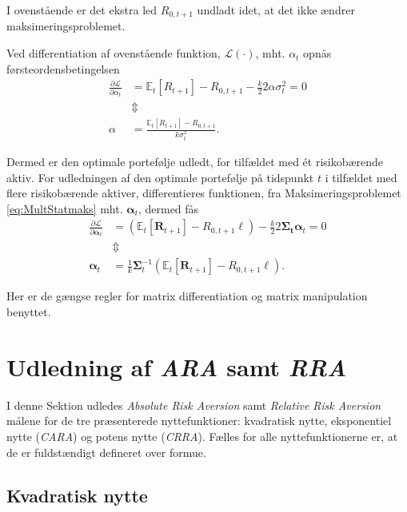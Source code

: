 \documentclass[
  a4paper,
  oneside]{memoir}
\begin{document}
I ovenstående er det ekstra led \(R_{0,t+1}\) undladt idet, at det ikke ændrer maksimeringsproblemet.

Ved differentiation af ovenstående funktion, \(\mathcal{L}(\cdot)\), mht. \(\alpha_t\) opnås førsteordensbetingelsen
\begin{align*}
\frac{\partial \mathcal{L}}{\partial \alpha_t} &= \mathbb{E}_t\left[R_{t+1}\right] - R_{0,t+1} - \frac{k}{2}2\alpha\sigma_t^2=0\\
&\Updownarrow\\
\alpha&=\frac{\mathbb{E}_t\left[R_{t+1}\right]-R_{0,t+1}}{k\sigma_t^2}.
\end{align*}

Dermed er den optimale portefølje udledt, for tilfældet med ét risikobærende aktiv. For udledningen af den optimale portefølje på tidspunkt \(t\) i tilfældet med flere risikobærende aktiver, differentieres funktionen, fra Maksimeringsproblemet \eqref{eq:MultStatmaks} mht. \(\bm{\alpha}_t\), dermed fås
\begin{align*}
\frac{\partial \mathcal{L}}{\partial \bm{\alpha}_t} &= \left(\mathbb{E}_t\left[\bm{R}_{t+1}\right]- R_{0,t+1}\bm{\ell}\right) - \frac{k}{2}2\bm{\Sigma_t}\bm{\alpha}_t = 0\\
&\Updownarrow\\
\bm{\alpha}_t&=\frac{1}{k}\bm{\Sigma}_t^{-1}\left(\mathbb{E}_t\left[\bm{R}_{t+1}\right]-R_{0,t+1}\bm{\ell}\right).
\end{align*}

Her er de gængse regler for matrix differentiation og matrix manipulation benyttet.

\hypertarget{udledning-af-ara-samt-rra}{%
\section{\texorpdfstring{Udledning af \emph{ARA} samt \emph{RRA}}{Udledning af ARA samt RRA}}\label{udledning-af-ara-samt-rra}}

I denne Sektion udledes \emph{Absolute Risk Aversion} samt \emph{Relative Risk Aversion} målene for de tre præsenterede nyttefunktioner: kvadratisk nytte, eksponentiel nytte (\emph{CARA}) og potens nytte (\emph{CRRA}). Fælles for alle nyttefunktionerne er, at de er fuldstændigt defineret over formue.

\hypertarget{kvadratisk-nytte-1}{%
\subsection{Kvadratisk nytte}\label{kvadratisk-nytte-1}}
\end{document}
